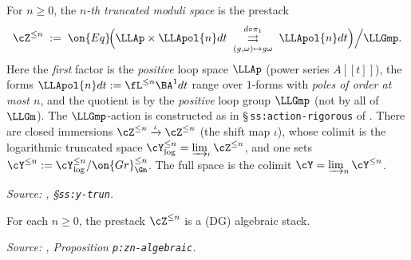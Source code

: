 \begin{definition}
  \label{def:Z-leq-n}
  For $n \geq 0$, the \emph{$n$-th truncated moduli space} is the prestack
  \[
    \cZ^{\leq n} \;:=\; \on{Eq}\!\Big(\LLAp \times \LLApol{n}dt
    \;\underset{(g,\omega)\mapsto g\omega}{\overset{d \circ \pi_1}{\rightrightarrows}}\;
    \LLApol{n}dt\Big)\Big/ \LLGmp.
  \]
  Here the \emph{first} factor is the \emph{positive} loop space $\LLAp$
  (power series $A[[t]]$), the forms $\LLApol{n}dt := \fL^{\leq n}\BA^1 dt$
  range over $1$-forms with \emph{poles of order at most $n$}, and the
  quotient is by the \emph{positive} loop group $\LLGmp$ (not by all of
  $\LLGm$). The $\LLGmp$-action is constructed as in
  \S\,\texttt{ss:action-rigorous} of \cite{hilburn-raskin}.
  There are closed immersions $\cZ^{\leq n} \xrightarrow{\iota} \cZ^{\leq n}$
  (the shift map $\iota$), whose colimit is the logarithmic truncated space
  $\cY_{\log}^{\leq n} = \varinjlim_\iota \cZ^{\leq n}$, and one sets
  $\cY^{\leq n} := \cY_{\log}^{\leq n}/\on{Gr}_{\Gm}^{\leq n}$.
  The full space is the colimit $\cY = \varinjlim_n \cY^{\leq n}$.

  \textit{Source: \cite{hilburn-raskin}, \S\texttt{ss:y-trun}.}
\end{definition}

\begin{proposition}
  \label{prop:Z-leq-n-algebraic}
  For each $n \geq 0$, the prestack $\cZ^{\leq n}$ is a (DG) algebraic stack.

  \textit{Source: \cite{hilburn-raskin}, Proposition \texttt{p:zn-algebraic}.}
\end{proposition}

